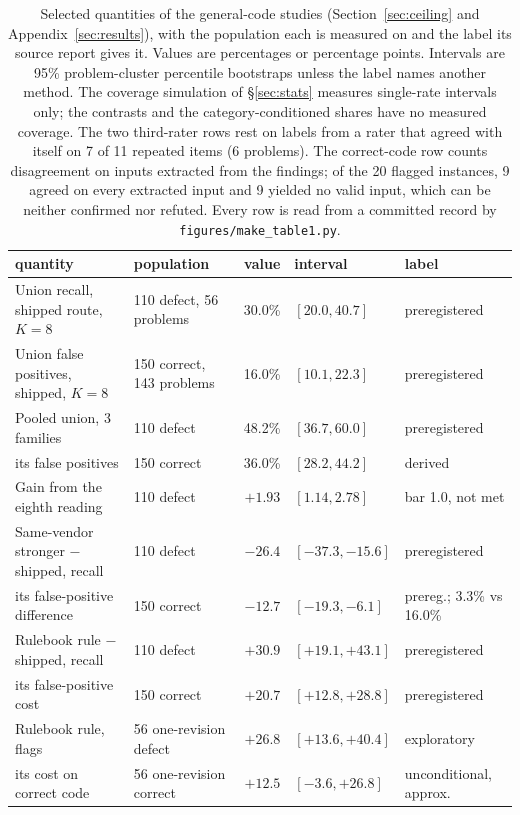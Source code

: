 \begin{table}[t]
\caption{Selected quantities of the general-code studies (Section~\ref{sec:ceiling} and Appendix~\ref{sec:results}), with the population each is measured on and the label its source report gives it. Values are percentages or percentage points. Intervals are 95\% problem-cluster percentile bootstraps unless the label names another method. The coverage simulation of \S\ref{sec:stats} measures single-rate intervals only; the contrasts and the category-conditioned shares have no measured coverage. The two third-rater rows rest on labels from a rater that agreed with itself on 7 of 11 repeated items (6 problems). The correct-code row counts disagreement on inputs extracted from the findings; of the 20 flagged instances, 9 agreed on every extracted input and 9 yielded no valid input, which can be neither confirmed nor refuted. Every row is read from a committed record by \texttt{figures/make\_table1.py}.}
\label{tab:primary}
\centering
\footnotesize\setlength{\tabcolsep}{4pt}
\begin{tabular}{@{}llrll@{}}
\toprule
quantity & population & value & interval & label \\
\midrule
Union recall, shipped route, $K=8$ & 110 defect, 56 problems & 30.0\% & $[20.0, 40.7]$ & preregistered \\
Union false positives, shipped, $K=8$ & 150 correct, 143 problems & 16.0\% & $[10.1, 22.3]$ & preregistered \\
Pooled union, 3 families & 110 defect & 48.2\% & $[36.7, 60.0]$ & preregistered \\
\quad its false positives & 150 correct & 36.0\% & $[28.2, 44.2]$ & derived \\
Gain from the eighth reading & 110 defect & $+1.93$ & $[1.14, 2.78]$ & bar 1.0, not met \\
Same-vendor stronger $-$ shipped, recall & 110 defect & $-26.4$ & $[-37.3, -15.6]$ & preregistered \\
\quad its false-positive difference & 150 correct & $-12.7$ & $[-19.3, -6.1]$ & prereg.; 3.3\% vs 16.0\% \\
Rulebook rule $-$ shipped, recall & 110 defect & $+30.9$ & $[+19.1, +43.1]$ & preregistered \\
\quad its false-positive cost & 150 correct & $+20.7$ & $[+12.8, +28.8]$ & preregistered \\
Rulebook rule, flags & 56 one-revision defect & $+26.8$ & $[+13.6, +40.4]$ & exploratory \\
\quad its cost on correct code & 56 one-revision correct & $+12.5$ & $[-3.6, +26.8]$ & unconditional, approx. \\

\end{tabular}
\end{table}
